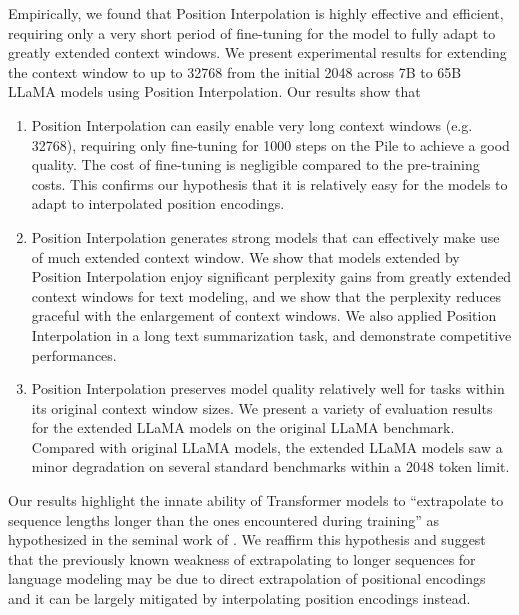 \documentclass{article} %
\theoremstyle{definition}
\begin{document}
Empirically, we found that Position Interpolation is highly effective and efficient, requiring only a very short period of fine-tuning for the model to fully adapt to greatly extended context windows. We present experimental results for extending the context window to up to 32768 from the initial 2048 across 7B to 65B LLaMA models using Position Interpolation. Our results show that
\begin{enumerate}
    \item Position Interpolation can easily enable very long context windows (e.g. 32768), requiring only fine-tuning for 1000 steps on the Pile \citep{pile} to achieve a good quality. 
    The cost of fine-tuning is negligible compared to the pre-training costs. 
    This confirms our hypothesis that it is relatively easy for the models to adapt to interpolated position encodings.
    
    \item Position Interpolation generates strong models that can effectively make use of much extended context window. We show that models extended by Position Interpolation enjoy significant perplexity gains from greatly extended context windows for text modeling, and we show that the perplexity reduces graceful with the enlargement of context windows. We also applied Position Interpolation in a long text summarization task, and demonstrate competitive performances.
    
    \item Position Interpolation preserves model quality relatively well for tasks within its original context window sizes. We present a variety of evaluation results for the extended LLaMA models on the original LLaMA benchmark. Compared with original LLaMA models, the extended LLaMA models saw a minor degradation on several standard benchmarks within a 2048 token limit.
\end{enumerate}

Our results highlight the innate ability of Transformer models to “extrapolate to sequence lengths longer than the ones encountered during training” as hypothesized in the seminal work of \citet{transformer}. We reaffirm this hypothesis and suggest that the previously known weakness of extrapolating to longer sequences for language modeling \citep{press2022train} may be due to direct extrapolation of positional encodings and it can be largely mitigated by interpolating position encodings instead. 
\end{document}
